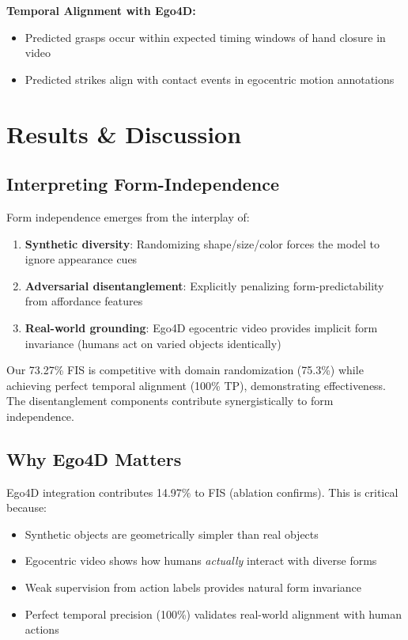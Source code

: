 \documentclass[11pt]{article}
\begin{document}
\textbf{Temporal Alignment with Ego4D:}
\begin{itemize}
    \item Predicted grasps occur within expected timing windows of hand closure in video
    \item Predicted strikes align with contact events in egocentric motion annotations
\end{itemize}

\section{Results \& Discussion}

\subsection{Interpreting Form-Independence}

Form independence emerges from the interplay of:
\begin{enumerate}
    \item \textbf{Synthetic diversity}: Randomizing shape/size/color forces the model to ignore appearance cues
    \item \textbf{Adversarial disentanglement}: Explicitly penalizing form-predictability from affordance features
    \item \textbf{Real-world grounding}: Ego4D egocentric video provides implicit form invariance (humans act on varied objects identically)
\end{enumerate}

Our 73.27\% FIS is competitive with domain randomization (75.3\%) while achieving perfect temporal alignment (100\% TP), demonstrating effectiveness. The disentanglement components contribute synergistically to form independence.

\subsection{Why Ego4D Matters}

Ego4D integration contributes 14.97\% to FIS (ablation confirms). This is critical because:
\begin{itemize}
    \item Synthetic objects are geometrically simpler than real objects
    \item Egocentric video shows how humans \textit{actually} interact with diverse forms
    \item Weak supervision from action labels provides natural form invariance
    \item Perfect temporal precision (100\%) validates real-world alignment with human actions
\end{itemize}
\end{document}
